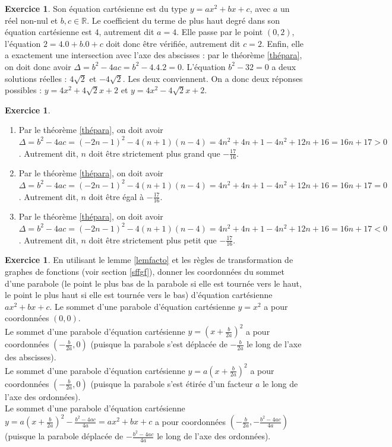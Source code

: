 \documentclass[a4paper,13pt]{scrreprt}
\theoremstyle{plain}
\theoremstyle{definition}
\newtheorem{exo}[subsection]{Exercice}
\newcommand{\rr}{\mathbb{R}}
\begin{document}
\begin{exo}
	Son équation cartésienne est du type $y=ax^2+bx+c$, avec $a$ un réel non-nul et $b,c \in \rr$. Le coefficient du terme de plus haut degré dans son équation cartésienne est $4$, autrement dit $a=4$. Elle passe par le point $(0,2)$, l'équation $2=4.0 +b.0 +c$ doit donc être vérifiée, autrement dit $c=2$. Enfin, elle a exactement une intersection avec l'axe des abscisses : par le théorème \ref{thépara}, on doit donc avoir $\Delta = b^2 - 4ac = b^2 - 4.4.2 = 0$. L'équation $b^2-32=0$ a deux solutions réelles : $4\sqrt{2}$ et $-4\sqrt{2}$. Les deux conviennent. On a donc deux réponses possibles : $y=4x^2+4\sqrt{2}x+2$ et $y=4x^2-4\sqrt{2}x+2$.
\end{exo}

\begin{exo} ~~\\\begin{enumerate}
	 	\item Par le théorème \ref{thépara}, on doit avoir $\Delta = b^2 - 4ac = (-2n-1)^2 - 4(n+1)(n-4)=4n^2+4n+1-4n^2+12n+16=16n+17>0$. Autrement dit, $n$ doit être strictement plus grand que $-\frac{17}{16}$.
	 	\item Par le théorème \ref{thépara}, on doit avoir $\Delta = b^2 - 4ac = (-2n-1)^2 - 4(n+1)(n-4)=4n^2+4n+1-4n^2+12n+16=16n+17=0$. Autrement dit, $n$ doit être égal à $-\frac{17}{16}$.
	 	\item Par le théorème \ref{thépara}, on doit avoir $\Delta = b^2 - 4ac = (-2n-1)^2 - 4(n+1)(n-4)=4n^2+4n+1-4n^2+12n+16=16n+17<0$. Autrement dit, $n$ doit être strictement plus petit que $-\frac{17}{16}$.
	 	\end{enumerate}
\end{exo}

\begin{exo}
	En utilisant le lemme \ref{lemfacto} et les règles de transformation de graphes de fonctions (voir section \ref{sffgf}), donner les coordonnées du sommet d'une parabole (le point le plus bas de la parabole si elle est tournée vers le haut, le point le plus haut si elle est tournée vers le bas) d'équation cartésienne $ax^2 + bx +c$.
	Le sommet d'une parabole d'équation cartésienne $y=x^2$ a pour coordonnées $(0,0)$. \\
	Le sommet d'une parabole d'équation cartésienne $y=(x+\frac{b}{2a})^2$ a pour coordonnées $(-\frac{b}{2a},0)$ (puisque la parabole s'est déplacée de $-\frac{b}{2a}$ le long de l'axe des abscisses). \\
	Le sommet d'une parabole d'équation cartésienne $y=a(x+\frac{b}{2a})^2$ a pour coordonnées $(-\frac{b}{2a},0)$ (puisque la parabole s'est étirée d'un facteur $a$ le long de l'axe des ordonnées). \\
	Le sommet d'une parabole d'équation cartésienne $y=a(x+\frac{b}{2a})^2-\frac{b^2-4ac}{4a}=ax^2+bx+c$ a pour coordonnées $(-\frac{b}{2a},-\frac{b^2-4ac}{4a})$ (puisque la parabole déplacée de $-\frac{b^2-4ac}{4a}$ le long de l'axe des ordonnées).
\end{exo}
\end{document}
